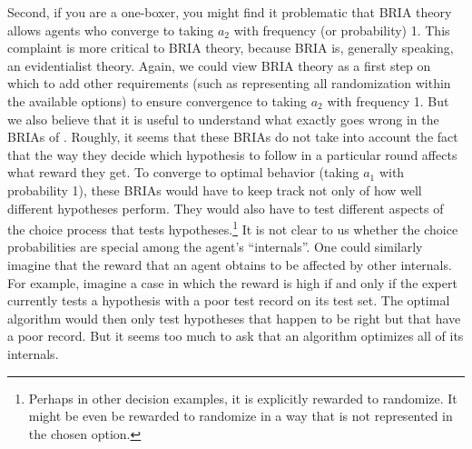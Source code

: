 \documentclass[submission,copyright,creativecommons]{eptcs}
\begin{document}
\begin{extendedonlyblock}
Second, if you are a one-boxer, you might find it problematic that BRIA theory allows agents who converge to taking $a_2$ with frequency (or probability) 1. This complaint is more critical to BRIA theory, because BRIA is, generally speaking, an evidentialist theory. Again, we could view BRIA theory as a first step on which to add other requirements (such as representing all randomization within the available options) to ensure convergence to taking $a_2$ with frequency 1. But we also believe that it is useful to understand what exactly goes wrong in the BRIAs of . Roughly, it seems that these BRIAs do not take into account the fact that the way they decide which hypothesis to follow in a particular round affects what reward they get. To converge to optimal behavior (taking $a_1$ with probability 1), these BRIAs would have to keep track not only of how well different hypotheses perform. They would also have to test different aspects of the choice process that tests hypotheses.\footnote{Perhaps in other decision examples, it is explicitly rewarded to randomize. It might be even be rewarded to randomize in a way that is not represented in the chosen option.} It is not clear to us whether the choice probabilities are special among the agent's \enquote{internals}. One could similarly imagine that the reward that an agent obtains to be affected by other internals. For example, imagine a case in which the reward is high if and only if the expert currently tests a hypothesis with a poor test record on its test set. The optimal algorithm would then only test hypotheses that happen to be right but that have a poor record. But it seems too much to ask that an algorithm optimizes all of its internals.

\end{extendedonlyblock}
\end{document}
